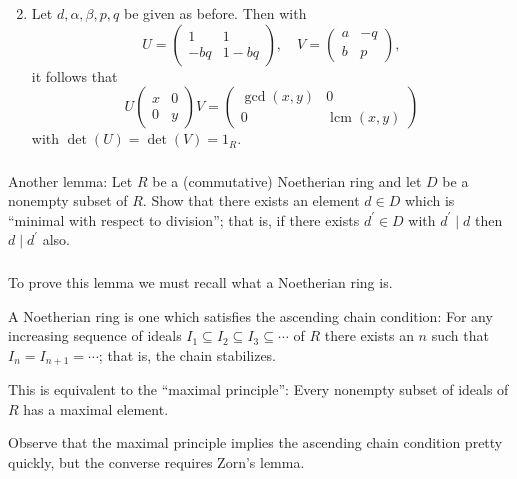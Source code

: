 \documentclass{beamer}
\DeclareMathOperator{\lcm}{lcm}
\begin{document}
\begin{frame}
  \frametitle{}

  \begin{enumerate}
    \setcounter{enumi}{1}
    \item Let $d,\alpha,\beta,p,q$ be given as before. Then with 
    \[U = \begin{pmatrix}
      1 & 1 \\ -bq & 1-bq
    \end{pmatrix}, \quad V = \begin{pmatrix}
      a & -q \\ b & p
    \end{pmatrix},\] it follows that \[U\begin{pmatrix}
      x & 0 \\ 0 & y
    \end{pmatrix} V = \begin{pmatrix}
      \gcd(x,y) & 0 \\ 0 & \lcm(x,y)
    \end{pmatrix}\] with $\det(U) = \det(V) = 1_R$. 

  \end{enumerate}

\end{frame}

\begin{frame}
  \frametitle{}

  Another lemma: Let $R$ be a (commutative) Noetherian ring and let $D$ be a nonempty subset of $R$. Show that there exists an element $d\in D$ which is ``minimal with respect to division''; that is, if there exists $d^{\prime}\in D$ with $d^{\prime}\mid d$ then $d\mid d^{\prime}$ also.

\end{frame}

\begin{frame}
  \frametitle{}

  To prove this lemma we must recall what a Noetherian ring is.
  
  A Noetherian ring is one which satisfies the ascending chain condition: For any increasing sequence of ideals $I_1\subseteq I_2\subseteq I_3 \subseteq\cdots$ of $R$ there exists an $n$ such that $I_n = I_{n+1} = \cdots$; that is, the chain stabilizes.

  This is equivalent to the ``maximal principle'': Every nonempty subset of ideals of $R$ has a maximal element.

  Observe that the maximal principle implies the ascending chain condition pretty quickly, but the converse requires Zorn's lemma.

\end{frame}
\end{document}
